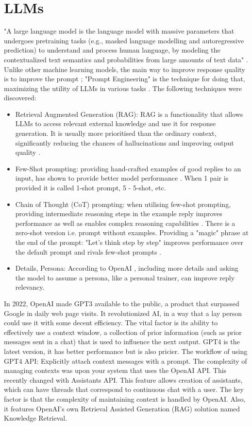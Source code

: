 \section{LLMs}
"A large language model is the language model with massive
parameters that undergoes pretraining tasks (e.g., masked
language modelling and autoregressive prediction) to understand and process human language, by modeling the
contextualized text semantics and probabilities from large
amounts of text data" \cite{Yao2023ASO}.
Unlike other machine learning models, the main way to improve response quality is to improve the prompt \cite{Liu2021PretrainPA}; "Prompt Engineering" is the technique for doing that, maximizing the utility of LLMs in various tasks \cite{zhou2023large}. The following techniques were discovered:
\begin{itemize}
   \item Retrieval Augmented Generation (RAG): RAG is a functionality that allows LLMs to access relevant external knowledge and use it for response generation. It is usually more prioritised than the ordinary context, significantly reducing the chances of hallucinations and improving output quality \cite{gao2024retrievalaugmented}.
   \item Few-Shot prompting:  providing hand-crafted examples of good replies to an input, has shown to provide better model performance \cite{brown2020language, min2022rethinking}. When 1 pair is provided it is called 1-shot prompt, 5 - 5-shot, etc. 
   \item Chain of Thought (CoT) prompting: when utilising few-shot prompting, providing intermediate reasoning steps in the example reply improves performance as well as enables complex reasoning capabilities \cite{wei2023chainofthought}. There is a zero-shot version i.e. prompt without examples. Providing a "magic" phrase at the end of the prompt: "Let's think step by step" improves performance over the default prompt and rivals few-shot prompts \cite{kojima2023large}.
   \item Details, Persona: According to OpenAI \cite{openAI}, including more details and asking the model to assume a persona, like a personal trainer, can improve reply relevancy. 
\end{itemize}
 In 2022, OpenAI made GPT3 available to the public, a product that surpassed Google in daily web page visits. It revolutionized AI, in a way that a lay person could use it with some decent efficiency. The vital factor is its ability to effectively use a context window, a collection of prior information (such as prior messages sent in a chat) that is used to influence the next output. GPT4 is the latest version, it has better performance but is also pricier. The workflow of using GPT4 API: Explicitly attach context messages with a prompt. The complexity of managing contexts was upon your system that uses the OpenAI API. This recently changed with Assistants API. This feature allows creation of assistants, which can have threads that correspond to continuous chat with a user. The key factor is that the complexity of maintaining context is handled by OpenAI. Also, it features OpenAI's own Retrieval Assisted Generation (RAG) solution named Knowledge Retrieval. 

